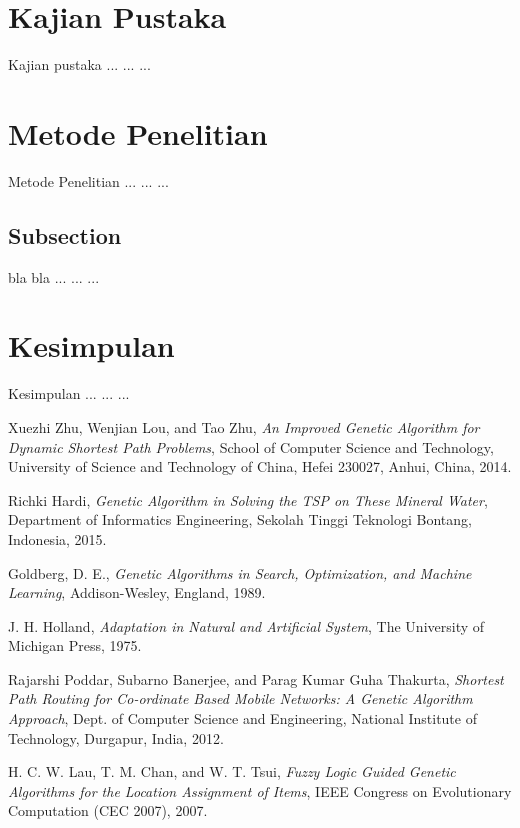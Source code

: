 \documentclass[journal]{IEEEtran}
\begin{document}
\section{Kajian Pustaka}
Kajian pustaka ... ... ...

\section{Metode Penelitian}
Metode Penelitian ... ... ...

\subsection{Subsection}
bla bla ... ... ...

\section{Kesimpulan}
Kesimpulan ... ... ...

\begin{thebibliography}{5}

Xuezhi Zhu, Wenjian Lou, and Tao Zhu,
\textit{An Improved Genetic Algorithm for Dynamic Shortest Path Problems},
School of Computer Science and Technology, University of Science and Technology of China, Hefei 230027, Anhui, China, 2014.

Richki Hardi,
\textit{Genetic Algorithm in Solving the TSP on These Mineral Water},
Department of Informatics Engineering, Sekolah Tinggi Teknologi Bontang, Indonesia, 2015.

Goldberg, D. E.,
\textit{Genetic Algorithms in Search, Optimization, and Machine Learning},
Addison-Wesley, England, 1989.

J. H. Holland,
\textit{Adaptation in Natural and Artificial System},
The University of Michigan Press, 1975.

Rajarshi Poddar, Subarno Banerjee, and Parag Kumar Guha Thakurta,
\textit{Shortest Path Routing for Co-ordinate Based Mobile Networks: A Genetic Algorithm Approach},
Dept. of Computer Science and Engineering, National Institute of Technology, Durgapur, India, 2012.

H. C. W. Lau, T. M. Chan, and W. T. Tsui,
\textit{Fuzzy Logic Guided Genetic Algorithms for the Location Assignment of Items},
IEEE Congress on Evolutionary Computation (CEC 2007), 2007.

\end{thebibliography}
\end{document}
